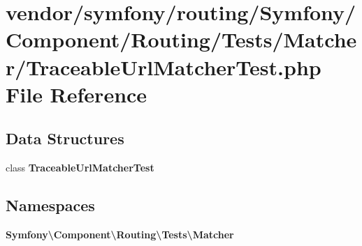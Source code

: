 \section{vendor/symfony/routing/\+Symfony/\+Component/\+Routing/\+Tests/\+Matcher/\+Traceable\+Url\+Matcher\+Test.php File Reference}
\label{_traceable_url_matcher_test_8php}
\subsection*{Data Structures}
\begin{DoxyCompactItemize}
\item 
class {\bf Traceable\+Url\+Matcher\+Test}
\end{DoxyCompactItemize}
\subsection*{Namespaces}
\begin{DoxyCompactItemize}
\item 
 {\bf Symfony\textbackslash{}\+Component\textbackslash{}\+Routing\textbackslash{}\+Tests\textbackslash{}\+Matcher}
\end{DoxyCompactItemize}
